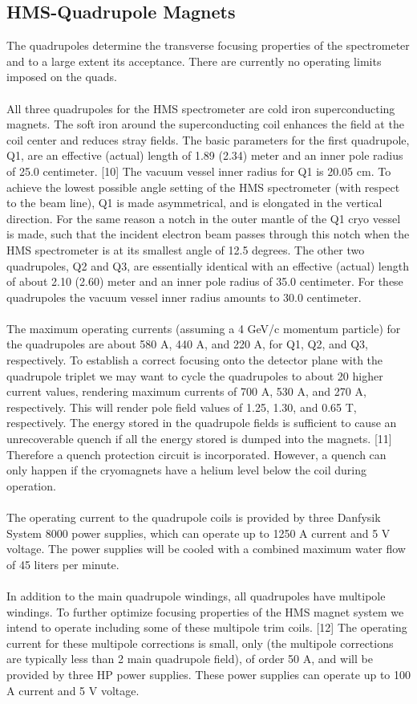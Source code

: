 \documentclass[12pt,epsf,here]{article}
\begin{document}
\subsection{ HMS-Quadrupole Magnets}
The quadrupoles determine the transverse focusing properties of the
spectrometer and to a large extent its acceptance. There are currently no
operating limits imposed on the quads.\\
\\
All three quadrupoles for the HMS spectrometer are cold iron
superconducting magnets. The soft iron around the superconducting coil
enhances the field at the coil center and reduces stray fields. The basic
parameters for the first quadrupole, Q1, are an effective (actual) length
of 1.89 (2.34) meter and an inner pole radius of 25.0 centimeter. [10] The
vacuum vessel inner radius for Q1 is 20.05 cm. To achieve the lowest
possible angle setting of the HMS spectrometer (with respect to the beam
line), Q1 is made asymmetrical, and is elongated in the vertical
direction. For the same reason a notch in the outer mantle of the Q1 cryo
vessel is made, such that the incident electron beam passes through this
notch when the HMS spectrometer is at its smallest angle of 12.5 degrees.
The other two quadrupoles, Q2 and Q3, are essentially identical with an
effective (actual) length of about 2.10 (2.60) meter and an inner pole
radius of 35.0 centimeter. For these quadrupoles the vacuum vessel inner
radius amounts to 30.0 centimeter.\\
\\
The maximum operating currents (assuming a 4 GeV/c momentum particle) for
the quadrupoles are about 580 A, 440 A, and 220 A, for Q1, Q2, and Q3,
respectively. To establish a correct focusing onto the detector plane with
the quadrupole triplet we may want to cycle the quadrupoles to about 20%
higher current values, rendering maximum currents of 700 A, 530 A, and 270
A, respectively. This will render pole field values of 1.25, 1.30, and
0.65 T, respectively. The energy stored in the quadrupole fields is
sufficient to cause an unrecoverable quench if all the energy stored is
dumped into the magnets. [11] Therefore a quench protection circuit is
incorporated. However, a quench can only happen if the cryomagnets have a
helium level below the coil during operation.\\
\\
The operating current to the quadrupole coils is provided by three
Danfysik System 8000 power supplies, which can operate up to 1250 A
current and 5 V voltage. The power supplies will be cooled with a combined
maximum water flow of 45 liters per minute.\\ 
\\
In addition to the main quadrupole windings, all quadrupoles have
multipole windings.  To further optimize focusing properties of the HMS
magnet system we intend to operate including some of these multipole trim
coils. [12] The operating current for these multipole corrections is
small, only (the multipole corrections are typically less than 2%
main quadrupole field), of order 50 A, and will be provided by three HP
power supplies. These power supplies can operate up to 100 A current and 5
V voltage.\\
\\
\end{document}
